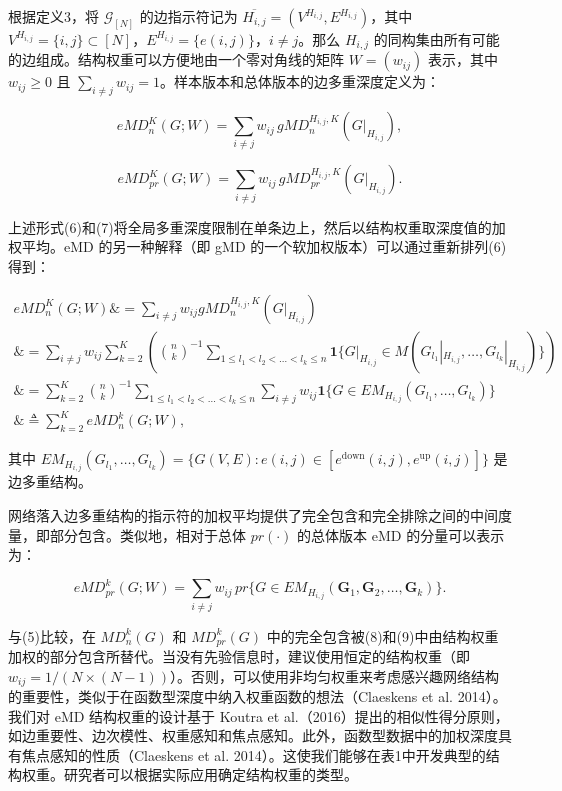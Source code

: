 \documentclass[
  10
]{article}
\begin{document}
根据定义3，将 $\mathcal{G}_{[N]}$ 的边指示符记为 $\overline{H_{i,j}}=(V^{H_{i,j}},E^{H_{i,j}})$，其中 $V^{H_{i,j}}=\{i,j\}\subset[N]$，$E^{H_{i,j}}=\{e(i,j)\}$，$i\neq j$。那么 $H_{i,j}$ 的同构集由所有可能的边组成。结构权重可以方便地由一个零对角线的矩阵 $W=(w_{ij})$ 表示，其中 $w_{ij}\geq 0$ 且 $\sum_{i\neq j}w_{ij}=1$。样本版本和总体版本的边多重深度定义为：

$$
eMD_n^K(G;W)=\sum_{i\neq j} w_{ij}\, gMD_n^{H_{i,j},K}(G|_{H_{i,j}}),
$$

$$
eMD_{pr}^K(G;W)=\sum_{i\neq j} w_{ij}\, gMD_{pr}^{H_{i,j},K}(G|_{H_{i,j}}).
$$

上述形式(6)和(7)将全局多重深度限制在单条边上，然后以结构权重取深度值的加权平均。eMD 的另一种解释（即 gMD 的一个软加权版本）可以通过重新排列(6)得到：

$$
\begin{aligned}
eMD_n^K(G;W) \&= \sum_{i\neq j} w_{ij} gMD_n^{H_{i,j},K}(G|_{H_{i,j}}) \\
\&= \sum_{i\neq j} w_{ij} \sum_{k=2}^K \left(\binom{n}{k}^{-1} \sum_{1\leq l_1<l_2<\dots<l_k\leq n} \mathbf{1}\{G|_{H_{i,j}} \in M(G_{l_1}|_{H_{i,j}},\dots,G_{l_k}|_{H_{i,j}})\}\right) \\
\&= \sum_{k=2}^K \binom{n}{k}^{-1} \sum_{1\leq l_1<l_2<\dots<l_k\leq n} \sum_{i\neq j} w_{ij} \mathbf{1}\{G\in EM_{H_{i,j}}(G_{l_1},\dots,G_{l_k})\} \\
\&\triangleq \sum_{k=2}^K eMD_n^k(G;W),
\end{aligned}
$$

其中 $EM_{H_{i,j}}(G_{l_1},\dots,G_{l_k}) = \{G(V,E): e(i,j)\in [e^{\mathrm{down}}(i,j), e^{\mathrm{up}}(i,j)]\}$ 是边多重结构。

网络落入边多重结构的指示符的加权平均提供了完全包含和完全排除之间的中间度量，即部分包含。类似地，相对于总体 $pr(\cdot)$ 的总体版本 eMD 的分量可以表示为：

$$
eMD_{pr}^k(G;W)=\sum_{i\neq j} w_{ij}\, pr\{G\in EM_{H_{i,j}}(\mathbf{G}_1,\mathbf{G}_2,\dots,\mathbf{G}_k)\}.
$$

与(5)比较，在 $MD_n^k(G)$ 和 $MD_{pr}^k(G)$ 中的完全包含被(8)和(9)中由结构权重加权的部分包含所替代。当没有先验信息时，建议使用恒定的结构权重（即 $w_{ij}=1/(N\times(N-1))$）。否则，可以使用非均匀权重来考虑感兴趣网络结构的重要性，类似于在函数型深度中纳入权重函数的想法（Claeskens et al. 2014）。我们对 eMD 结构权重的设计基于 Koutra et al.（2016）提出的相似性得分原则，如边重要性、边次模性、权重感知和焦点感知。此外，函数型数据中的加权深度具有焦点感知的性质（Claeskens et al. 2014）。这使我们能够在表1中开发典型的结构权重。研究者可以根据实际应用确定结构权重的类型。
\end{document}
